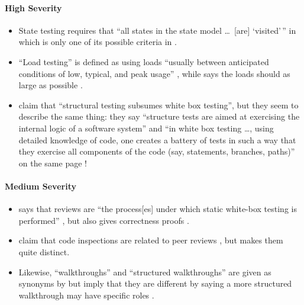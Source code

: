 \paragraph{High Severity}
\begin{itemize}
      \item State testing requires that ``all states in the state model
            \dots\ [are] `visited'\,'' in \citep[p.~19]{IEEE2021} which
            is only one of its possible criteria in \citep[pp.~82-83]{Patton2006}.
      \item ``Load testing'' is defined as using loads ``usually between
            anticipated conditions of low, typical, and peak usage''
            \citep[p.~5]{IEEE2022}, while \citeauthor{Patton2006} says the
            loads should as large as possible \citeyearpar[p.~86]{Patton2006}.
      \item \citeauthor{PetersAndPedrycz2000} claim that ``structural testing
            subsumes white box testing'', but they seem to describe the same
            thing: they say ``structure tests are aimed at exercising the
            internal logic of a software system'' and ``in white box testing
            \dots, using detailed knowledge of code, one creates a battery of
            tests in such a way that they exercise all components of the code
            (say, statements, branches, paths)'' on the same page
            \citeyearpar[p.~447]{PetersAndPedrycz2000}!
\end{itemize}

\paragraph{Medium Severity}
\begin{itemize}
      \item \citeauthor{Patton2006} says that reviews are ``the process[es] under
            which static white-box testing is performed''
            \citeyearpar[p.~92]{Patton2006}, but \citeauthor{vanVliet2000}
            also gives correctness proofs \citeyearpar[pp.~418-419]{vanVliet2000}.
      \item \citeauthor{ISTQB_author} claim that code inspections are
            related to peer reviews \citeyearpar{ISTQB}, but
            \citet[pp.~94-95]{Patton2006} makes them quite distinct.
      \item {} \label{walkthrough-syns}
            Likewise, ``walkthroughs'' and ``structured walkthroughs''
            are given as synonyms by \citetISTQB{} but
            \citeauthor{PetersAndPedrycz2000} imply that they are
            different by saying a more structured walkthrough may have
            specific roles \citeyearpar[p.~484]{PetersAndPedrycz2000}.
\end{itemize}

